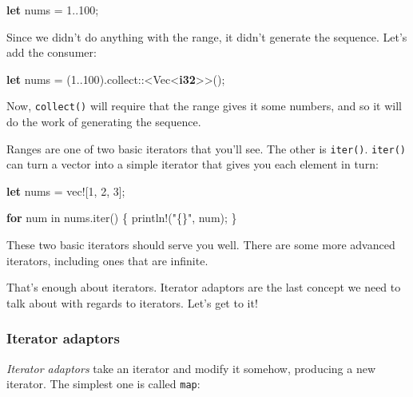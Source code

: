 \documentclass[a4paper,]{book}
\newenvironment{Shaded}{\begin{snugshade}}{\end{snugshade}}
\newcommand{\KeywordTok}[1]{\textcolor[rgb]{0.13,0.29,0.53}{\textbf{{#1}}}}
\newcommand{\DecValTok}[1]{\textcolor[rgb]{0.00,0.00,0.81}{{#1}}}
\newcommand{\StringTok}[1]{\textcolor[rgb]{0.31,0.60,0.02}{{#1}}}
\newcommand{\OtherTok}[1]{\textcolor[rgb]{0.56,0.35,0.01}{{#1}}}
\newcommand{\NormalTok}[1]{{#1}}
\begin{document}
\begin{Shaded}
\begin{Highlighting}[]
\KeywordTok{let} \NormalTok{nums = }\DecValTok{1.}\NormalTok{.}\DecValTok{100}\NormalTok{;}
\end{Highlighting}
\end{Shaded}

Since we didn't do anything with the range, it didn't generate the
sequence. Let's add the consumer:

\begin{Shaded}
\begin{Highlighting}[]
\KeywordTok{let} \NormalTok{nums = (}\DecValTok{1.}\NormalTok{.}\DecValTok{100}\NormalTok{).collect::<Vec<}\KeywordTok{i32}\NormalTok{>>();}
\end{Highlighting}
\end{Shaded}

Now, \texttt{collect()} will require that the range gives it some
numbers, and so it will do the work of generating the sequence.

Ranges are one of two basic iterators that you'll see. The other is
\texttt{iter()}. \texttt{iter()} can turn a vector into a simple
iterator that gives you each element in turn:

\begin{Shaded}
\begin{Highlighting}[]
\KeywordTok{let} \NormalTok{nums = }\OtherTok{vec!}\NormalTok{[}\DecValTok{1}\NormalTok{, }\DecValTok{2}\NormalTok{, }\DecValTok{3}\NormalTok{];}

\KeywordTok{for} \NormalTok{num in nums.iter() \{}
   \OtherTok{println!}\NormalTok{(}\StringTok{"\{\}"}\NormalTok{, num);}
\NormalTok{\}}
\end{Highlighting}
\end{Shaded}

These two basic iterators should serve you well. There are some more
advanced iterators, including ones that are infinite.

That's enough about iterators. Iterator adaptors are the last concept we
need to talk about with regards to iterators. Let's get to it!

\subsubsection{Iterator adaptors}\label{iterator-adaptors}

\emph{Iterator adaptors} take an iterator and modify it somehow,
producing a new iterator. The simplest one is called \texttt{map}:
\end{document}
